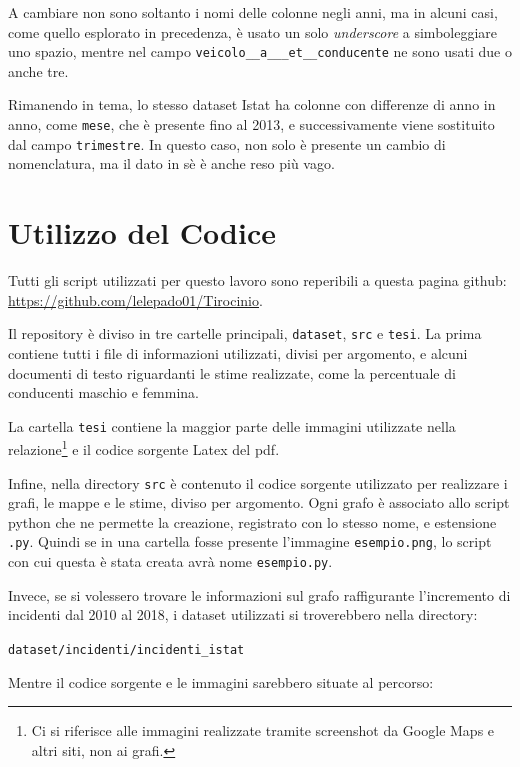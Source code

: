 \documentclass[a4paper,12pt]{report}
\newcommand{\columnstyle}[1]{\texttt{#1}}
\newcommand{\filenamestyle}[1]{\texttt{#1}}
\newcommand{\quotestyle}[1]{\textit{#1}}
\newcommand{\skipline}{\vspace{0.2in}}
\begin{document}
\begin{center}
A cambiare non sono soltanto i nomi delle colonne negli anni, 
ma in alcuni casi, 
come quello esplorato in precedenza, è usato un solo \quotestyle{underscore} a 
simboleggiare uno spazio, mentre nel campo \columnstyle{veicolo\_\_a\_\_\_et\_\_conducente} 
ne sono usati due o anche tre.

Rimanendo in tema, lo stesso dataset Istat ha colonne con differenze di anno in anno, 
come \columnstyle{mese}, che è presente fino al 2013, e successivamente viene 
sostituito dal campo \columnstyle{trimestre}. 
In questo caso, non solo è presente un cambio di nomenclatura, ma il dato in sè è 
anche reso più vago.

\chapter{Utilizzo del Codice}

Tutti gli script utilizzati per questo lavoro sono reperibili a questa pagina 
github: \url{https://github.com/lelepado01/Tirocinio}.

Il repository è diviso in tre cartelle principali, \filenamestyle{dataset}, \filenamestyle{src} 
e \filenamestyle{tesi}. La prima contiene tutti i file di informazioni utilizzati, divisi per 
argomento, e alcuni documenti di testo riguardanti le stime realizzate, come la percentuale di 
conducenti maschio e femmina.

La cartella \columnstyle{tesi} contiene la maggior parte delle immagini utilizzate 
nella relazione\footnote{Ci si riferisce alle immagini realizzate tramite screenshot 
da Google Maps e altri siti, non ai grafi.} 
e il codice sorgente Latex del pdf.

Infine, nella directory \filenamestyle{src} è contenuto il codice sorgente utilizzato per realizzare 
i grafi, le mappe e le stime, diviso per argomento. 
Ogni grafo è associato allo script python che ne permette la creazione, registrato con 
lo stesso nome, e estensione \filenamestyle{.py}. 
Quindi se in una cartella fosse presente l'immagine \filenamestyle{esempio.png}, lo script con 
cui questa è stata creata avrà nome \filenamestyle{esempio.py}.

Invece, se si volessero trovare le informazioni sul grafo raffigurante 
l'incremento di incidenti 
dal 2010 al 2018, i dataset utilizzati si troverebbero nella directory:

\skipline
\indent\filenamestyle{dataset/incidenti/incidenti\_istat}

\skipline
\noindent Mentre il codice sorgente e le immagini sarebbero situate al percorso:


\end{center}
\end{document}
